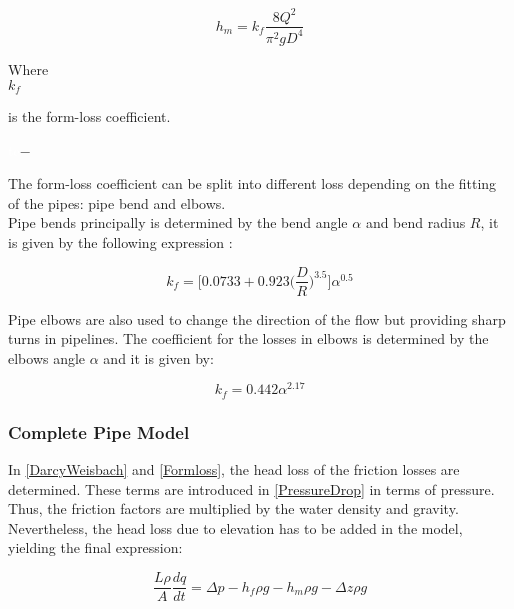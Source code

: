 \begin{equation}
   h_m = k_f \frac{8Q^2}{\pi^2gD^4}
\label{Formloss}
\end{equation}

 \begin{minipage}[t]{0.20\textwidth}
Where\\
\hspace*{8mm} $k_f$ 
\end{minipage}
\begin{minipage}[t]{0.68\textwidth}
\vspace*{2mm}
is the form-loss coefficient.  
 \end{minipage}
\begin{minipage}[t]{0.10\textwidth}
\vspace*{2mm}
\textcolor{White}{te}$\unit{-}$
\end{minipage}

The form-loss coefficient can be split into different loss depending on the 
fitting of the pipes: pipe bend and elbows. 
\\
Pipe bends principally is determined by the 
bend angle $\alpha$ and bend radius $R$, it is given by the following 
expression \cite{Design_Water}: 

\begin{equation}
  k_f = \bigg[0.0733 + 0.923 \bigg(\frac{D}{R}\bigg)^{3.5}\bigg]\alpha^{0.5}
\end{equation}

Pipe elbows are also used to change the direction of the flow but providing 
sharp turns in pipelines. The coefficient for the losses in elbows is determined by the elbows angle $\alpha$ and it is given by:

\begin{equation}
  k_f = 0.442\alpha^{2.17}
\end{equation}

\subsubsection{Complete Pipe Model}
In \eqref{DarcyWeisbach} and \eqref{Formloss}, the head loss of the friction losses are determined. These terms are introduced in \eqref{PressureDrop} in terms of pressure. Thus, the friction factors are multiplied by the water density and gravity. Nevertheless, the head loss due to elevation has to be added in the model, yielding the final expression:

\begin{equation}
   \frac{L \rho}{A} \frac{dq}{dt} =\Delta p - h_f \rho g - h_m \rho g - \Delta z \rho 
   g
\end{equation}


